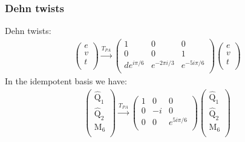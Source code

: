 \documentclass[12pt,a4paper]{article}
\newcounter{arrow}
\begin{document}
\subsubsection{Dehn twists}
Dehn twists:
\begin{align}
\left( \begin{matrix}
e\\
v\\
t\\
\end{matrix} \right) \xrightarrow{T_{PA}} 
\left( \begin{matrix}
1 & 0 & 0 \\
0 & 0 & 1 \\
d e^{i \pi /6} & e^{-2 \pi i/3} & e^{- 5i \pi /6}\\
\end{matrix} \right) 
\left( \begin{matrix}
e\\
v\\
t\\
\end{matrix} \right)
\end{align}
In the idempotent basis we have:
\begin{align}
\left( \begin{matrix}
\widehat{\text{Q}}_1\\
\widehat{\text{Q}}_2\\
\text{M}_6\\
\end{matrix} \right) \xrightarrow{T_{PA}}
\left( \begin{matrix}
1 & 0 & 0\\
0 & -i & 0 \\
0 & 0& e^{5i \pi /6} \\
\end{matrix} \right)
\left( \begin{matrix}
\widehat{\text{Q}}_1\\
\widehat{\text{Q}}_2\\
\text{M}_6\\
\end{matrix} \right)
\end{align}
\end{document}
